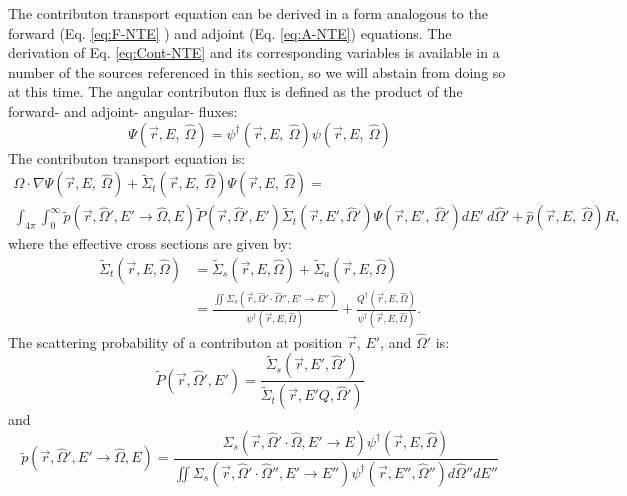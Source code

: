 The contributon transport equation can be derived in a form analogous
to the forward (Eq. \ref{eq:F-NTE} ) and adjoint (Eq. \ref{eq:A-NTE}) equations.
The derivation of Eq. \ref{eq:Cont-NTE} and its corresponding variables is
available in a number of the sources referenced in this section, so we will
abstain from doing so at this time.
The angular contributon flux is defined
as the product of the forward- and
adjoint- angular- fluxes:
\begin{equation}
\Psi (\vec {r} ,E,\:\hat\Omega) = \psi^{\dagger} (\vec {r} ,E,\:\hat\Omega)
        \psi(\vec {r} ,E,\:\hat\Omega)
\label{eq.Cont-Flux}
\end{equation}
The contributon transport equation is:
\begin{multline}
\hat\Omega \cdot \nabla \Psi (\vec {r} ,E,\:\hat\Omega)
+\widetilde{\Sigma} _{ t }(\vec{r},E,\:\hat\Omega)\Psi (\vec { r } ,E,\:\hat\Omega)
     = \\
        \int _{ 4\pi  } \int _{ 0 }^{ \infty  }
        \widetilde{p}(\vec{r}, \hat\Omega', E'\rightarrow\hat\Omega, E)
        \widetilde{P}(\vec{r}, \hat\Omega',E')
        \widetilde{\Sigma} _{ t }(\vec{r}, E', \hat\Omega')
        \Psi (\vec { r } ,E',\: \hat\Omega')dE' \:d\hat\Omega'
        + \hat p(\vec { r } ,E, \:\hat\Omega) R ,
\label{eq:Cont-NTE}
\end{multline}
where the effective cross sections are given by:
\begin{equation}
\begin{aligned}
\widetilde{\Sigma}_{t}(\vec{r}, E, \hat\Omega) &=
        \widetilde{\Sigma}_{s}(\vec{r}, E, \hat\Omega) +
        \widetilde{\Sigma}_{a}(\vec{r}, E, \hat\Omega)    \\
     &= \frac{\iint \Sigma_{s}(\vec{r},\hat\Omega'\cdot\hat\Omega'',
        E'\rightarrow E'')}{\psi^{\dagger}(\vec{r}, E, \hat\Omega)}
        + \frac{Q^{\dagger}(\vec{r}, E, \hat\Omega)}
        {\psi^{\dagger}(\vec{r}, E, \hat\Omega)}.
\end{aligned}
\end{equation}
The scattering probability of a contributon at position $\vec{r}$, $E'$, and
$\hat\Omega'$ is:
\begin{equation}
\widetilde{P}(\vec{r}, \hat\Omega',E') =
         \frac{\widetilde{\Sigma} _{ s }(\vec{r}, E', \hat\Omega')}
       {\widetilde{\Sigma} _{ t }(\vec{r}, E'Q, \hat\Omega')}
\end{equation}
and
\begin{equation}
\widetilde{p}(\vec{r}, \hat\Omega', E'\rightarrow\hat\Omega, E) =
       \frac{\Sigma_{s}(\vec{r},\hat\Omega'\cdot\hat\Omega,E'\rightarrow E)
       \psi^{\dagger} (\vec{r}, E, \hat\Omega)}
       {\iint \Sigma_{s}(\vec{r},\hat\Omega'\cdot\hat\Omega'',E'\rightarrow
       E'')\psi^{\dagger} (\vec{r}, E'', \hat\Omega'')d\hat\Omega'' dE''}
\end{equation}
